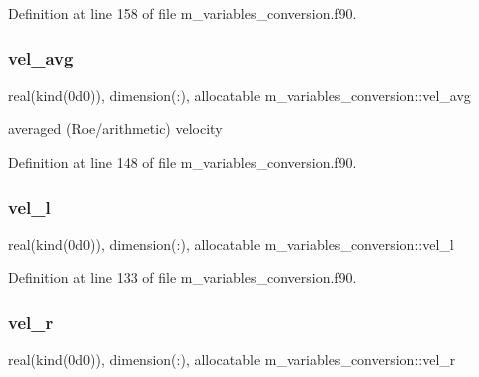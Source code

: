 Definition at line 158 of file m\+\_\+variables\+\_\+conversion.\+f90.

\mbox{\label{namespacem__variables__conversion_a8a9fd6029912bd540f67f414592f52f6}} 
\subsubsection{\texorpdfstring{vel\+\_\+avg}{vel\_avg}}
{\footnotesize\ttfamily real(kind(0d0)), dimension(\+:), allocatable m\+\_\+variables\+\_\+conversion\+::vel\+\_\+avg}



averaged (Roe/arithmetic) velocity 



Definition at line 148 of file m\+\_\+variables\+\_\+conversion.\+f90.

\mbox{\label{namespacem__variables__conversion_a9ef76270f02246abad03ce449673de84}} 
\subsubsection{\texorpdfstring{vel\+\_\+l}{vel\_l}}
{\footnotesize\ttfamily real(kind(0d0)), dimension(\+:), allocatable m\+\_\+variables\+\_\+conversion\+::vel\+\_\+l}



Definition at line 133 of file m\+\_\+variables\+\_\+conversion.\+f90.

\mbox{\label{namespacem__variables__conversion_a7e09e021d90fc326b8869c854321b9f2}} 
\subsubsection{\texorpdfstring{vel\+\_\+r}{vel\_r}}
{\footnotesize\ttfamily real(kind(0d0)), dimension(\+:), allocatable m\+\_\+variables\+\_\+conversion\+::vel\+\_\+r}



